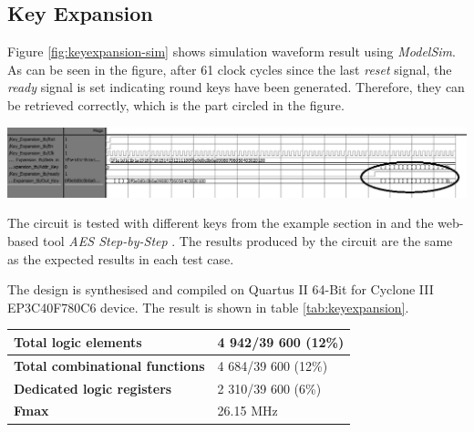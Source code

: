 \documentclass[a4paper, 10pt]{article}
\newenvironment{Figure}
    {\par\medskip\noindent\minipage{\linewidth}}
    {\endminipage\par\medskip}
\begin{document}
\begin{multicols}{2}
        \subsection{Key Expansion}

        Figure \ref{fig:keyexpansion-sim} shows simulation waveform result using \textit{ModelSim}. As can be seen in the figure, after 61 clock cycles since the last \textit{reset} signal, the \textit{ready} signal is set indicating round keys have been generated. Therefore, they can be retrieved correctly, which is the part circled in the figure.

            \begin{Figure}
                \centering
                \includegraphics[width=\linewidth]{KeyExpansion-GetRoundKeysStage-edited.png}
                \label{fig:keyexpansion-sim}
            \end{Figure}

        The circuit is tested with different keys from the example section in \cite{AES} and the web-based tool \textit{AES Step-by-Step} \cite{aes-step-by-step}. The results produced by the circuit are the same as the expected results in each test case.

	The design is synthesised and compiled on Quartus II 64-Bit for Cyclone III EP3C40F780C6 device. The result is shown in table \ref{tab:keyexpansion}.

	\noindent
	\begin{center}
		\label{tab:keyexpansion}
                    \begin{tabular}{| m{5.5cm} | m{3cm} |}
		\hline   
		\textbf{Total logic elements} & 4 942/39 600 (12\%)\\
                        \hline
                        \textbf{Total combinational functions} & 4 684/39 600 (12\%)\\
                        \hline
                        \textbf{Dedicated logic registers} & 2 310/39 600 (6\%)\\
                        \hline
				\textbf{Fmax} & 26.15 MHz\\
				\hline
                    \end{tabular}
	\end{center}


\end{multicols}
\end{document}
